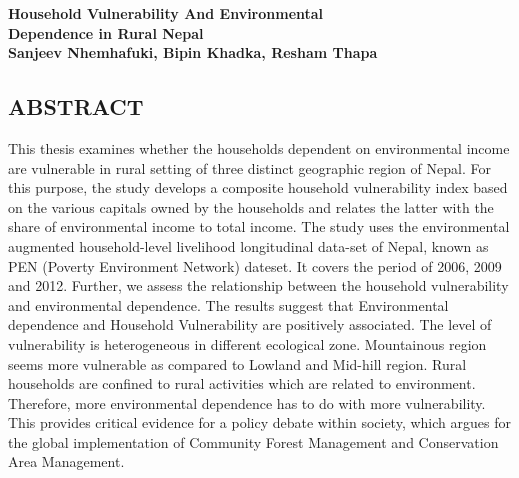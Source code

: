 
	\newpage %
	\begin{center}
		\textbf{\large{Household Vulnerability And Environmental\\ Dependence in Rural Nepal \\ \vspace{0.5cm}
				Sanjeev Nhemhafuki, Bipin Khadka, Resham Thapa }}
	\end{center}
	\begin{center}
		\section*{\large{ABSTRACT}}
	\end{center}	
	
	\renewcommand{\thepage}{\roman{page}}
	\setcounter{page}{5}
	This thesis examines whether the households dependent on environmental income are vulnerable in rural setting of three distinct geographic region of Nepal. For this purpose, the study develops a composite household vulnerability index based on the various capitals owned by the households and relates the latter with the share of environmental income to total income. The study uses the environmental augmented household-level livelihood longitudinal data-set of Nepal, known as PEN (Poverty Environment Network) dateset. It covers the period of 2006, 2009 and 2012. Further, we assess the relationship between the household vulnerability and environmental dependence. The results suggest that Environmental dependence and Household Vulnerability are positively associated. The level of vulnerability is heterogeneous in different ecological zone. Mountainous region seems more vulnerable as compared to Lowland and Mid-hill region. Rural households are confined to rural activities which are related to environment. Therefore, more environmental dependence has to do with more vulnerability. This provides critical evidence for a policy debate within society, which argues for the global implementation of Community Forest Management and Conservation Area Management.   
	
	